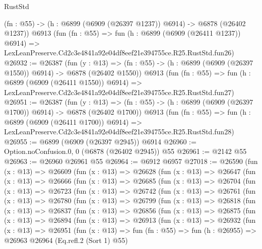 \begin{lexlean}{RustStd}
\begin{coremodule}
    (fn : @55) -> (h : @6899 (@6909 (@26397 @1237)) @6914) -> @6878 (@26402 @1237))
    @6913
    (fun (fn : @55) =>
    fun (h : @6899 (@6909 (@26411 @1237)) @6914) =>
    LexLeanPreserve.Cd2c3e4841a92e04df8eef21e394755ce.R25.RustStd.fun26)
@26932 := @26387
    (fun (y : @13) =>
    (fn : @55) -> (h : @6899 (@6909 (@26397 @1550)) @6914) -> @6878 (@26402 @1550))
    @6913
    (fun (fn : @55) =>
    fun (h : @6899 (@6909 (@26411 @1550)) @6914) =>
    LexLeanPreserve.Cd2c3e4841a92e04df8eef21e394755ce.R25.RustStd.fun27)
@26951 := @26387
    (fun (y : @13) =>
    (fn : @55) -> (h : @6899 (@6909 (@26397 @1700)) @6914) -> @6878 (@26402 @1700))
    @6913
    (fun (fn : @55) =>
    fun (h : @6899 (@6909 (@26411 @1700)) @6914) =>
    LexLeanPreserve.Cd2c3e4841a92e04df8eef21e394755ce.R25.RustStd.fun28)
@26955 := @6899 (@6909 (@26397 @2945)) @6914
@26960 := Option.noConfusion.{0, 0} (@6878 (@26402 @2945)) @55
@26961 := @2142 @55
@26963 := @26960 @26961 @55
@26964 := @6912 @6957
@27018 := @26590
    (fun (x : @13) =>
    @26609
      (fun (x : @13) =>
      @26628
        (fun (x : @13) =>
        @26647
          (fun (x : @13) =>
          @26666
            (fun (x : @13) =>
            @26685
              (fun (x : @13) =>
              @26704
                (fun (x : @13) =>
                @26723
                  (fun (x : @13) =>
                  @26742
                    (fun (x : @13) =>
                    @26761
                      (fun (x : @13) =>
                      @26780
                        (fun (x : @13) =>
                        @26799
                          (fun (x : @13) =>
                          @26818
                            (fun (x : @13) =>
                            @26837
                              (fun (x : @13) =>
                              @26856
                                (fun (x : @13) =>
                                @26875
                                  (fun (x : @13) =>
                                  @26894
                                    (fun (x : @13) =>
                                    @26913
                                      (fun (x : @13) =>
                                      @26932
                                        (fun (x : @13) =>
                                        @26951
                                          (fun (x : @13) =>
                                          fun (fn : @55) =>
                                          fun (h : @26955) =>
                                          @26963
                                            @26964
                                            (Eq.refl.{2} (Sort 1) @55)

\end{coremodule}
\end{lexlean}
